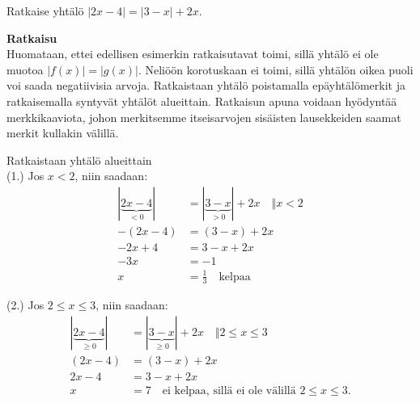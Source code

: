 \begin{esimerkki}
	Ratkaise yhtälö $|2x-4|=|3-x|+2x$.
	
	\textbf{Ratkaisu} \\
	Huomataan, ettei edellisen esimerkin ratkaisutavat toimi, sillä yhtälö ei ole muotoa $|f(x)|=|g(x)|$. Neliöön korotuskaan ei toimi, sillä yhtälön oikea puoli voi saada negatiivisia arvoja. Ratkaistaan yhtälö poistamalla epäyhtälömerkit ja ratkaisemalla syntyvät yhtälöt alueittain. Ratkaisun apuna voidaan hyödyntää merkkikaaviota, johon merkitsemme itseisarvojen sisäisten lausekkeiden saamat merkit kullakin välillä.\\
	
	
\begin{lukusuora}{0}{4}{4}
\end{lukusuora}
\begin{lukusuora}{1}{5}{4}
\end{lukusuora}

\begin{center}
\begin{merkkikaavio}{2}

	\merkkikaavioMerkki{$-$}
	\merkkikaavioMerkki{$+$}
	\merkkikaavioMerkki{$+$}

\merkkikaavioUusirivi
	\merkkikaavioMerkki{$+$}
	\merkkikaavioMerkki{$+$}
	\merkkikaavioMerkki{$-$}

\end{merkkikaavio}
\end{center}

Ratkaistaan yhtälö alueittain\\
(1.) \quad Jos $x<2$, niin saadaan:
\begin{align*}
	|\underbrace{2x-4}_{<0}|&=|\underbrace{3-x}_{>0}|+2x \quad \Vert x<2  \\
	-(2x-4)&=(3-x)+2x \\
	-2x+4&=3-x+2x \\
	-3x &= -1 \\
	x &= \frac{1}{3} \quad \text{kelpaa}
\end{align*}

(2.) \quad Jos $2\leq x\leq 3$, niin saadaan:
\begin{align*}
	|\underbrace{2x-4}_{\geq0}|&=|\underbrace{3-x}_{\geq0}|+2x \quad \Vert 2\leq x\leq 3  \\
	(2x-4)&=(3-x)+2x \\
	2x-4&=3-x+2x \\
	x &= 7 \quad \text{ei kelpaa, sillä ei ole välillä $2\leq x\leq 3$.}
\end{align*}


\end{esimerkki}
